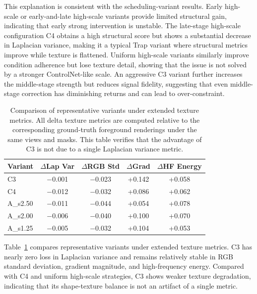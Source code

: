 \documentclass[times,twocolumn,final]{elsarticle}
\providecommand{\DIFadd}[1]{{\protect\color{blue} \sf #1}} %
\providecommand{\DIFaddbegin}{} %
\providecommand{\DIFaddend}{} %
\providecommand{\DIFaddFL}[1]{\DIFadd{#1}} %
\providecommand{\DIFaddbeginFL}{} %
\providecommand{\DIFaddendFL}{} %
\newcommand{\DIFaddincludegraphics}[2][]{{\color{blue}\fbox{\DIFOincludegraphics[#1]{#2}}}} %
\DeclareRobustCommand{\DIFaddbegin}{\DIFOaddbegin \let\includegraphics\DIFaddincludegraphics} %
\DeclareRobustCommand{\DIFaddend}{\DIFOaddend \let\includegraphics\DIFOincludegraphics} %
\DeclareRobustCommand{\DIFaddbeginFL}{\DIFOaddbeginFL \let\includegraphics\DIFaddincludegraphics} %
\DeclareRobustCommand{\DIFaddendFL}{\DIFOaddendFL \let\includegraphics\DIFOincludegraphics} %
\begin{document}
This explanation is consistent with the scheduling-variant results. Early high-scale or early-and-late high-scale variants provide limited structural gain, indicating that early strong intervention is unstable. The late-stage high-scale configuration C4 obtains a high structural score but shows a   \DIFaddbegin \DIFadd{substantial }\DIFaddend decrease in Laplacian variance, making it a typical Trap variant where structural metrics improve while texture is flattened. Uniform high-scale variants similarly improve condition adherence but lose texture detail, showing that the issue is not solved by a stronger ControlNet-like scale. An aggressive C3 variant further increases the middle-stage strength but reduces signal fidelity, suggesting that even middle-stage correction has diminishing returns and can lead to over-constraint.

\FloatBarrier

\begin{table}[h!]
\centering
\caption{Comparison of representative variants under extended texture metrics. All delta texture metrics are computed relative to the corresponding ground-truth foreground renderings under the same views and masks. This table verifies that the advantage of C3 is not due to a single Laplacian variance metric.}
\label{tab:extended}
  \DIFaddbeginFL \small
\begin{tabular}{lcccc}
\toprule
\DIFaddFL{Variant }& \DIFaddFL{$\Delta$Lap Var }& \DIFaddFL{$\Delta$RGB Std }& \DIFaddFL{$\Delta$Grad }& \DIFaddFL{$\Delta$HF Energy }\\
\midrule
\DIFaddFL{C3 }& \DIFaddFL{$-$0.001 }& \DIFaddFL{$-$0.023 }& \DIFaddFL{+0.142 }& \DIFaddFL{+0.058 }\\
\DIFaddFL{C4 }& \DIFaddFL{$-$0.012 }& \DIFaddFL{$-$0.032 }& \DIFaddFL{+0.086 }& \DIFaddFL{+0.062 }\\
\DIFaddFL{A\_s2.50 }& \DIFaddFL{$-$0.011 }& \DIFaddFL{$-$0.044 }& \DIFaddFL{+0.054 }& \DIFaddFL{+0.078 }\\
\DIFaddFL{A\_s2.00 }& \DIFaddFL{$-$0.006 }& \DIFaddFL{$-$0.040 }& \DIFaddFL{+0.100 }& \DIFaddFL{+0.070 }\\
\DIFaddFL{A\_s1.25 }& \DIFaddFL{$-$0.005 }& \DIFaddFL{$-$0.032 }& \DIFaddFL{+0.104 }& \DIFaddFL{+0.053 }\\
\bottomrule
\end{tabular}
\DIFaddendFL \end{table}

\DIFaddbegin \DIFadd{Table~\ref{tab:extended} compares representative variants under extended texture metrics. }\DIFaddend C3 has nearly zero loss in Laplacian variance and remains relatively stable in RGB standard deviation, gradient magnitude, and high-frequency energy. Compared with C4 and uniform high-scale strategies, C3 shows weaker texture degradation, indicating that its shape-texture balance is not an artifact of a single metric.
\end{document}
